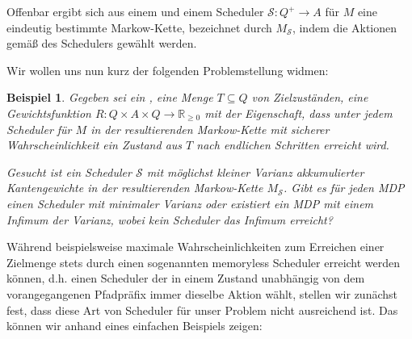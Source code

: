 \documentclass[a4paper]{article}
\newcommand{\mc}{Markow-Kette}
\newtheorem{beispiel}[satz]{Beispiel}
\theoremstyle{nonumberplain}
\begin{document}
Offenbar ergibt sich aus einem \mdp{} \mdpex{} und einem Scheduler $\mathcal{S} : Q^+ \to A$ für $M$ eine eindeutig bestimmte \mc{}, bezeichnet durch $M_{\mathcal{S}}$, indem die Aktionen gemäß des Schedulers gewählt werden.

Wir wollen uns nun kurz der folgenden Problemstellung widmen:

\begin{beispiel}
	Gegeben sei ein \mdp{} \mdpex{}, eine Menge $T \subseteq Q$ von Zielzuständen, eine Gewichtsfunktion $R : Q \times A \times Q \to \mathbb{R}_{\geq 0}$ mit der Eigenschaft, dass unter jedem Scheduler für $M$ in der resultierenden \mc{} mit sicherer Wahrscheinlichkeit ein Zustand aus $T$ nach endlichen Schritten erreicht wird.
	
	Gesucht ist ein Scheduler $\mathcal{S}$ mit möglichst kleiner Varianz akkumulierter Kantengewichte in der resultierenden \mc{} $M_{\mathcal{S}}$. Gibt es für jeden MDP einen Scheduler mit minimaler Varianz oder existiert ein MDP mit einem Infimum der Varianz, wobei kein Scheduler das Infimum erreicht?
\end{beispiel}

Während beispielsweise maximale Wahrscheinlichkeiten zum Erreichen einer Zielmenge stets durch einen sogenannten memoryless Scheduler erreicht werden können, d.h. einen Scheduler der in einem Zustand unabhängig von dem vorangegangenen Pfadpräfix immer dieselbe Aktion wählt, stellen wir zunächst fest, dass diese Art von Scheduler für unser Problem nicht ausreichend ist. Das können wir anhand eines einfachen Beispiels zeigen:
\end{document}
